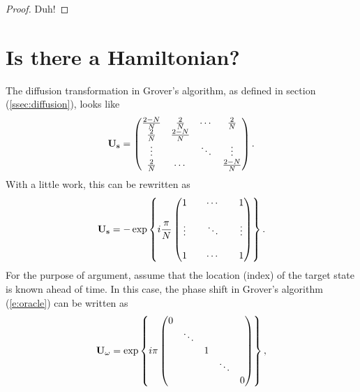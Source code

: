 \begin{proof}
Duh!
\end{proof}

\section{Is there a Hamiltonian?}

The diffusion transformation in Grover's algorithm,
as defined in section (\ref{ssec:diffusion}), looks like
\begin{equation}
{\bf U_s} =
\begin{pmatrix}
    \frac{2-N}{N} & \frac{2}{N} & \cdots & \frac{2}{N} \\
    \frac{2}{N}   & \frac{2-N}{N} & &  \\
    \vdots &  & \ddots & \vdots \\
    \frac{2}{N}   & \cdots && \frac{2-N}{N} 
\end{pmatrix}.
\end{equation}
With a little work, this can be rewritten as
\begin{equation}
{\bf U_s} =
- \exp \left\lbrace  i\frac{\pi}{N}
                \begin{pmatrix}
                    1      &        & \cdots &      & 1 \\
                    \\
                    \vdots &        & \ddots &      & \vdots \\
                    \\
                    1      &        & \cdots &      & 1
                \end{pmatrix}
\right\rbrace.
\end{equation}
For the purpose of argument, assume that the location (index) of
the target state is known ahead of time.  In this case, the
phase shift in Grover's algorithm (\ref{e:oracle}) can be written as
\begin{equation}
{\bf U_\omega} = 
\exp \left\lbrace  i\pi
                \begin{pmatrix}
                    0       &        &        &        &  \\
                            & \ddots &        &        &  \\
                            &        & 1      &        &  \\
                            &        &        & \ddots &  \\
                            &        &        &        & 0
                \end{pmatrix}
\right\rbrace,
\end{equation}
